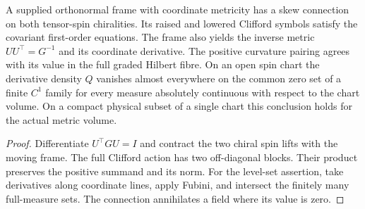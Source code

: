\begin{proposition}
\label{prop:spin-frame-joint-zero}
\leanok
A supplied orthonormal frame with coordinate metricity has a skew
connection on both tensor-spin chiralities. Its raised and lowered
Clifford symbols satisfy the covariant first-order equations.
The frame also yields the inverse metric $UU^\top=G^{-1}$ and its
coordinate derivative. The positive curvature pairing agrees with its value in the full
graded Hilbert fibre. On an open spin chart the derivative density
$Q$ vanishes almost everywhere on the common zero set of a finite
$C^1$ family for every measure absolutely continuous with respect to
the chart volume. On a compact physical subset of a single chart this
conclusion holds for the actual metric volume.
\end{proposition}
\begin{proof}
\leanok
Differentiate $U^\top G U=I$ and contract the two chiral spin lifts
with the moving frame. The full Clifford action has two off-diagonal
blocks. Their product preserves the positive summand and its norm.
For the level-set assertion, take derivatives along coordinate lines,
apply Fubini, and intersect the finitely many full-measure sets.
The connection annihilates a field where its value is zero.
\end{proof}

